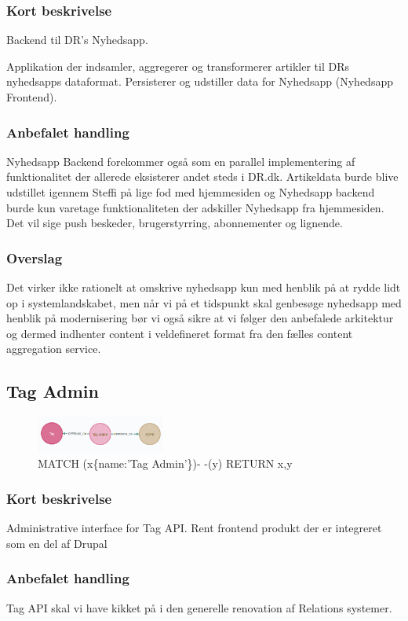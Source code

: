 \documentclass{article}
\begin{document}
\subsubsection*{Kort beskrivelse}
Backend til DR's Nyhedsapp.	

Applikation der indsamler, aggregerer og transformerer artikler til DRs nyhedsapps dataformat. Persisterer og udstiller data for Nyhedsapp (Nyhedsapp Frontend).
\subsubsection*{Anbefalet handling}
Nyhedsapp Backend forekommer også som en parallel implementering af funktionalitet der allerede eksisterer andet steds i DR.dk. 
Artikeldata burde blive udstillet igennem Steffi på lige fod med hjemmesiden og Nyhedsapp backend burde kun varetage funktionaliteten der adskiller Nyhedsapp fra hjemmesiden. Det vil sige push beskeder, brugerstyrring, abonnementer og lignende. 
\subsubsection*{Overslag}
Det virker ikke rationelt at omskrive nyhedsapp kun med henblik på at rydde lidt op i systemlandskabet, men når vi på et tidspunkt skal genbesøge nyhedsapp med henblik på modernisering bør vi også sikre at vi følger den anbefalede arkitektur og dermed indhenter content i veldefineret format fra den fælles content aggregation service.

\subsection{Tag Admin}
\begin{figure}[h]
\includegraphics[width=120pt]{TagAdmin.PNG}
\caption{MATCH (x\{name:'Tag Admin'\})- -(y) RETURN x,y}
\end{figure}
\subsubsection*{Kort beskrivelse}
Administrative interface for Tag API.
Rent frontend produkt der er integreret som en del af Drupal
\subsubsection*{Anbefalet handling}
Tag API skal vi have kikket på i den generelle renovation af Relations systemer.
\end{document}

